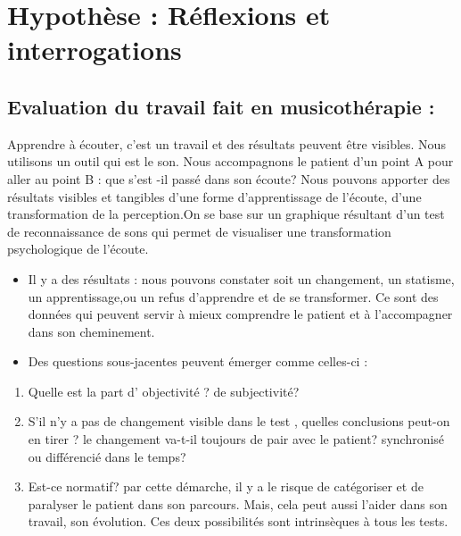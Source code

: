 \chapter{Hypothèse : Réflexions et interrogations}

\section{Evaluation du travail fait en musicothérapie : }

Apprendre à écouter, c'est un travail et des résultats peuvent être
visibles. Nous utilisons un outil qui est le son. Nous accompagnons
le patient d'un point A pour aller au point B : que s'est -il passé
dans son écoute? Nous pouvons apporter des résultats visibles et tangibles
d'une forme d'apprentissage de l'écoute, d'une transformation de la
perception.On se base sur un graphique résultant d'un test de reconnaissance
de sons qui permet de visualiser une transformation psychologique
de l'écoute. 
\begin{itemize}
\item Il y a des résultats : nous pouvons constater soit un changement,
un statisme, un apprentissage,ou un refus d'apprendre et de se transformer.
Ce sont des données qui peuvent servir à mieux comprendre le patient
et à l'accompagner dans son cheminement.
\item Des questions sous-jacentes peuvent émerger comme celles-ci :
\end{itemize}
\begin{enumerate}
\item Quelle est la part d' objectivité ? de subjectivité?
\item S'il n'y a pas de changement visible dans le test , quelles conclusions
peut-on en tirer ? le changement va-t-il toujours de pair avec le
patient? synchronisé ou différencié dans le temps?
\item Est-ce normatif? par cette démarche, il y a le risque de catégoriser
et de paralyser le patient dans son parcours. Mais, cela peut aussi
l'aider dans son travail, son évolution. Ces deux possibilités sont
intrinsèques à tous les tests.
\end{enumerate}
